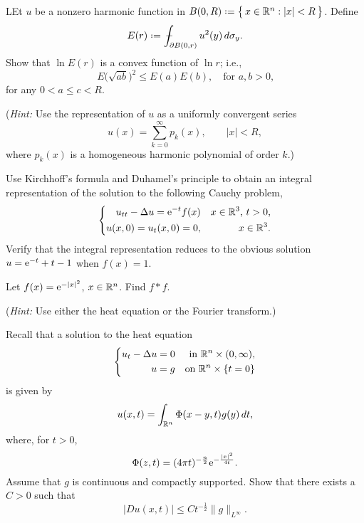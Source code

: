 \begin{problem}
  LEt \(u\) be a nonzero harmonic function in
  \(B(0,R)\defeq\bigl\{\,x\in\bbR^n:|x|<R\,\bigr\}\). Define
  \[
    E(r)\defeq\fint_{\partial B(0,r)}u^2(y)\diff\sigma_y.
  \]
  Show that \(\ln E(r)\) is a convex function of \(\ln r\); i.e.,
  \[
    E\bigl(\sqrt{ab}\bigr)^2\leq E(a)E(b),\quad\text{for \(a,b>0\),}
  \]
  for any \(0<a\leq c<R\).

  \noindent (\emph{Hint:} Use the representation of \(u\) as a uniformly
  convergent series
  \[
    u(x)=\sum_{k=0}^\infty p_k(x),\qquad |x|<R,
  \]
  where \(p_k(x)\) is a homogeneous harmonic polynomial of order \(k\).)
\end{problem}
\begin{solution*}
\end{solution*}

\begin{problem}
  Use Kirchhoff's formula and Duhamel's principle to obtain an integral
  representation of the solution to the following Cauchy problem,
  \[
    \left\{
      \begin{aligned}
        u_{tt}-\Delta u=\mathrm{e}^{-t}f(x)&&\text{\(x\in\mathbb{R}^3\), \(t>0\),}\\
        u(x,0)=u_t(x,0)=0,&&x\in\mathbb{R}^3.
      \end{aligned}
    \right.
  \]
  Verify that the integral representation reduces to the obvious solution
  \(u=\mathrm{e}^{-t}+t-1\) when \(f(x)=1\).
\end{problem}
\begin{solution*}
\end{solution*}

\begin{problem}
  Let \(f(x)=\mathrm{e}^{-|x|^2}\), \(x\in\mathbb{R}^n\). Find \(f*f\).

  \noindent (\emph{Hint:} Use either the heat equation or the Fourier
  transform.)
\end{problem}
\begin{solution*}
\end{solution*}

\begin{problem}
  Recall that a solution to the heat equation
  \[
    \left\{
      \begin{aligned}
        u_t-\Delta u=0&&\text{in \(\mathbb{R}^n\times(0,\infty)\),}\\
        u=g&&\text{on \(\mathbb{R}^n\times\{t=0\}\)}
      \end{aligned}
    \right.
  \]
  is given by
  \[
    u(x,t)=\int_{\mathbb{R}^n}\Phi(x-y,t)g(y)\mathop{}\!d t,
  \]
  where, for \(t>0\),
  \[
    \Phi(z,t)=(4\pi t)^{-\frac{n}{2}}\mathrm{e}^{-\frac{|x|^2}{4t}}.
  \]
  Assume that \(g\) is continuous and compactly supported. Show that there
  exists a \(C>0\) such that
  \[
    |D u(x,t)|\leq Ct^{-\frac{1}{2}}\|g\|_{L^\infty}.
  \]
\end{problem}
\begin{solution*}
\end{solution*}

